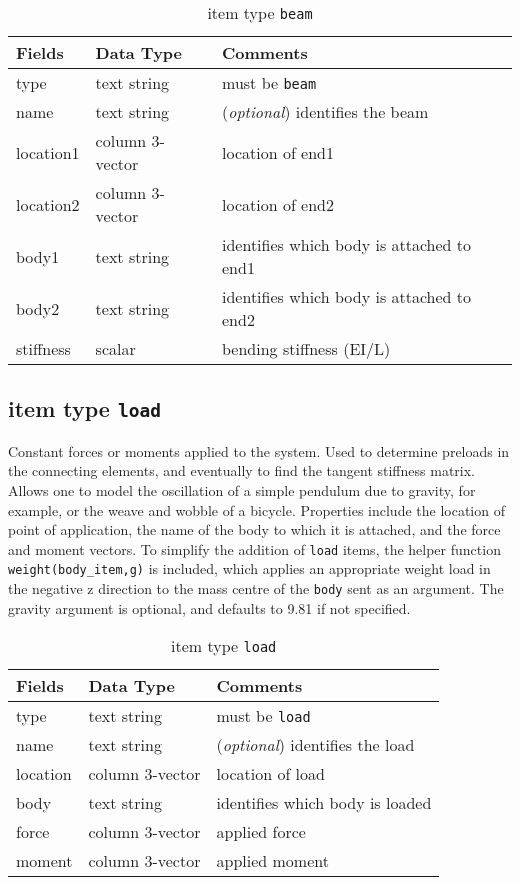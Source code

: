 \begin{table}[!h]
\caption{item type \texttt{beam}}
\label{beam}
\begin{center}
\begin{tabular}{lll}
\toprule
Fields & Data Type & Comments\\
\midrule
type & text string & must be \texttt{beam}\\
name & text string & (\emph{optional}) identifies the beam\\
location1 & column 3-vector & location of end1\\
location2 & column 3-vector & location of end2\\
body1 & text string & identifies which body is attached to end1\\
body2 & text string & identifies which body is attached to end2\\
stiffness & scalar & bending stiffness (EI/L)\\
\bottomrule
\end{tabular}
\end{center}
\end{table}
\clearpage

\subsection{item type \texttt{load}}
Constant forces or moments applied to the system. Used to determine preloads in the connecting elements, and eventually to find the tangent stiffness matrix.  Allows one to model the oscillation of a simple pendulum due to gravity, for example, or the weave and wobble of a bicycle.  Properties include the location of point of application, the name of the body to which it is attached, and the force and moment vectors.  To simplify the addition of \texttt{load} items, the helper function \texttt{weight(body\_item,g)} is included, which applies an appropriate weight load in the negative z direction to the mass centre of the \texttt{body} sent as an argument.  The gravity argument is optional, and defaults to 9.81 if not specified.

\begin{table}[!h]
\caption{item type \texttt{load}}
\label{load}
\begin{center}
\begin{tabular}{lll}
\toprule
Fields & Data Type & Comments\\
\midrule
type & text string & must be \texttt{load}\\
name & text string & (\emph{optional}) identifies the load\\
location & column 3-vector & location of load\\
body & text string & identifies which body is loaded\\
force & column 3-vector & applied force\\
moment & column 3-vector & applied moment\\
\bottomrule
\end{tabular}
\end{center}
\end{table}
\clearpage

